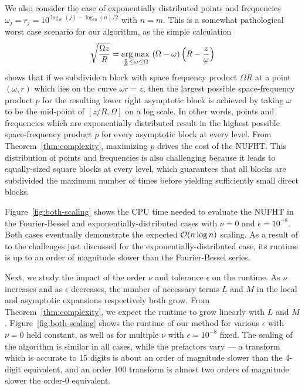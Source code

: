 We also consider the case of exponentially distributed points and frequencies
$\omega_j = r_j = 10^{\log_{10}(j) - \log_{10}(n)/2}$ with $n = m$. This is a
somewhat pathological worst case scenario for our algorithm, as the simple
calculation
\begin{equation}
  \sqrt{\frac{\Omega z}{R}} = \operatorname*{arg\,max}_{\frac{z}{R} \leq \omega \leq \Omega} \ (\Omega - \omega)\left(R - \frac{z}{\omega}\right)
\end{equation}
shows that if we subdivide a block with space frequency product $\Omega R$ at a
point $(\omega, r)$ which lies on the curve $\omega r = z$, then the largest
possible space-frequency product $p$ for the resulting lower right asymptotic
block is achieved by taking $\omega$ to be the mid-point of $[z/R, 
\Omega]$ on a log scale. In other words, points and frequencies which are
exponentially distributed result in the highest possible space-frequency product
$p$ for every asymptotic block at every level. From
Theorem~\ref{thm:complexity}, maximizing $p$ drives the cost of the NUFHT. This
distribution of points and frequencies is also challenging because it leads to
equally-sized square blocks at every level, which guarantees that all blocks are
subdivided the maximum number of times before yielding sufficiently small direct
blocks.

Figure~\ref{fig:both-scaling} shows the CPU time needed to evaluate the NUFHT in
the Fourier-Bessel and exponentially-distributed cases with $\nu=0$ and
$\epsilon=10^{-8}$. Both cases eventually demonstrate the expected $\mathcal{O}(n\log
n)$ scaling. As a result of to the challenges just discussed for the
exponentially-distributed case, its runtime is up to an order of magnitude
slower than the Fourier-Bessel series.

Next, we study the impact of the order $\nu$ and tolerance $\epsilon$ on the
runtime. As $\nu$ increases and as $\epsilon$ decreases, the number of necessary
terms $L$ and $M$ in the local and asymptotic expansions respectively both grow.
From Theorem~\ref{thm:complexity}, we expect the runtime to grow linearly with
$L$ and $M$. Figure~\ref{fig:both-scaling} shows the runtime of our method for
various $\epsilon$ with $\nu=0$ held constant, as well as for multiple $\nu$
with $\epsilon=10^{-8}$ fixed. The scaling of the algorithm is similar in all
cases, while the prefactors vary --- a transform which is accurate to 15 digits
is about an order of magnitude slower than the 4-digit equivalent, and an order
100 transform is almost two orders of magnitude slower the order-0 equivalent.

